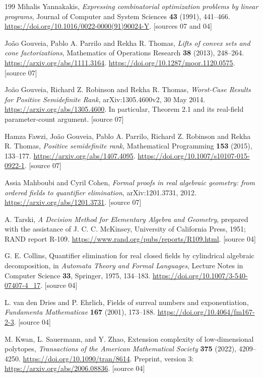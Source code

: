 \documentclass[11pt,a4paper]{article}
\numberwithin{equation}{section}
\theoremstyle{plain}
\newcommand{\srcnote}[1]{\textup{[#1]}}%
\newcommand{\smallurl}[1]{{\small\url{#1}}}
\newcounter{polybibc}
\newenvironment{polybiblist}[1]{\let\section\subsection\renewcommand{\refname}{#1}%
 \begin{thebibliography}{199}\setcounter{enumiv}{\value{polybibc}}}%
 {\setcounter{polybibc}{\value{enumiv}}\end{thebibliography}}
\begin{document}
\begin{polybiblist}{Part V (manuscripts 07 and 04)}
Mihalis Yannakakis,
\emph{Expressing combinatorial optimization problems by linear programs},
Journal of Computer and System Sciences \textbf{43} (1991), 441--466.
\url{https://doi.org/10.1016/0022-0000(91)90024-Y}.
\srcnote{sources 07 and 04}

Jo\~ao Gouveia, Pablo A. Parrilo and Rekha R. Thomas,
\emph{Lifts of convex sets and cone factorizations},
Mathematics of Operations Research \textbf{38} (2013), 248--264.
\url{https://arxiv.org/abs/1111.3164}.
\url{https://doi.org/10.1287/moor.1120.0575}.
\srcnote{source 07}

Jo\~ao Gouveia, Richard Z. Robinson and Rekha R. Thomas,
\emph{Worst-Case Results for Positive Semidefinite Rank},
arXiv:1305.4600v2, 30 May 2014.
\url{https://arxiv.org/abs/1305.4600}.
In particular, Theorem 2.1 and its real-field parameter-count argument.
\srcnote{source 07}

Hamza Fawzi, Jo\~ao Gouveia, Pablo A. Parrilo, Richard Z. Robinson and
Rekha R. Thomas,
\emph{Positive semidefinite rank},
Mathematical Programming \textbf{153} (2015), 133--177.
\url{https://arxiv.org/abs/1407.4095}.
\url{https://doi.org/10.1007/s10107-015-0922-1}.
\srcnote{source 07}

Assia Mahboubi and Cyril Cohen,
\emph{Formal proofs in real algebraic geometry: from ordered fields to
quantifier elimination}, arXiv:1201.3731, 2012.
\url{https://arxiv.org/abs/1201.3731}.
\srcnote{source 07}

A. Tarski,
\emph{A Decision Method for Elementary Algebra and Geometry},
prepared with the assistance of J. C. C. McKinsey,
University of California Press, 1951; RAND report R-109.
\smallurl{https://www.rand.org/pubs/reports/R109.html}.
\srcnote{source 04}

G. E. Collins,
Quantifier elimination for real closed fields by cylindrical algebraic
decomposition,
in \emph{Automata Theory and Formal Languages},
Lecture Notes in Computer Science \textbf{33}, Springer, 1975, 134--183.
\smallurl{https://doi.org/10.1007/3-540-07407-4_17}.
\srcnote{source 04}

L. van den Dries and P. Ehrlich,
Fields of surreal numbers and exponentiation,
\emph{Fundamenta Mathematicae} \textbf{167} (2001), 173--188.
\smallurl{https://doi.org/10.4064/fm167-2-3}.
\srcnote{source 04}

M. Kwan, L. Sauermann, and Y. Zhao,
Extension complexity of low-dimensional polytopes,
\emph{Transactions of the American Mathematical Society} \textbf{375}
(2022), 4209--4250.
\smallurl{https://doi.org/10.1090/tran/8614}.
Preprint, version 3: \smallurl{https://arxiv.org/abs/2006.08836}.
\srcnote{source 04}


\end{polybiblist}
\end{document}
